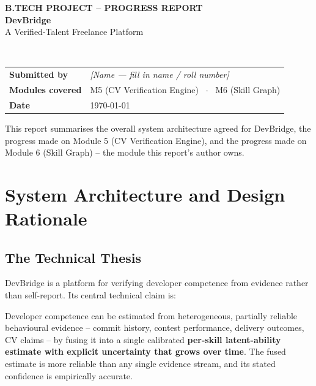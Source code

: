 \documentclass[11pt,a4paper]{article}
\newenvironment{notebox}[1]{%
  \def\FrameCommand{{\color{warn}\vrule width 2.2pt}\hspace{8pt}}%
  \MakeFramed{\advance\hsize-\width \FrameRestore}%
  \noindent{\sffamily\footnotesize\bfseries\color{warn}#1}\par\smallskip
  \small
}{%
  \par\endMakeFramed
}
\begin{document}
\thispagestyle{empty}

\begin{center}
{\sffamily\footnotesize\bfseries\color{mutedgray}\MakeUppercase{B.Tech Project -- Progress Report}}\\[0.55cm]
{\sffamily\Huge\bfseries\color{accent} DevBridge}\\[0.2cm]
{\sffamily\large\color{inkgray} A Verified-Talent Freelance Platform}\\[0.55cm]
\\[0.5cm]
\begin{tabular}{ll}
\sffamily\bfseries\color{mutedgray} Submitted by & \emph{[Name --- fill in name / roll number]} \\[2pt]
\sffamily\bfseries\color{mutedgray} Modules covered & M5 (CV Verification Engine) \ $\cdot$ \ M6 (Skill Graph) \\[2pt]
\sffamily\bfseries\color{mutedgray} Date & \today \\
\end{tabular}
\end{center}
\vspace{0.3cm}
\noindent\small\color{inkgray}
This report summarises the overall system architecture agreed for DevBridge, the
progress made on Module 5 (CV Verification Engine), and the progress made on
Module 6 (Skill Graph) -- the module this report's author owns.
\normalsize\color{black}
\vspace{0.2cm}

\section{System Architecture and Design Rationale}

\subsection{The Technical Thesis}

DevBridge is a platform for verifying developer competence from evidence
rather than self-report. Its central technical claim is:

\begin{notebox}{Central claim}
Developer competence can be estimated from heterogeneous, partially reliable
behavioural evidence -- commit history, contest performance, delivery
outcomes, CV claims -- by fusing it into a single calibrated
\textbf{per-skill latent-ability estimate with explicit uncertainty that
grows over time}. The fused estimate is more reliable than any single
evidence stream, and its stated confidence is empirically accurate.
\end{notebox}
\end{document}
